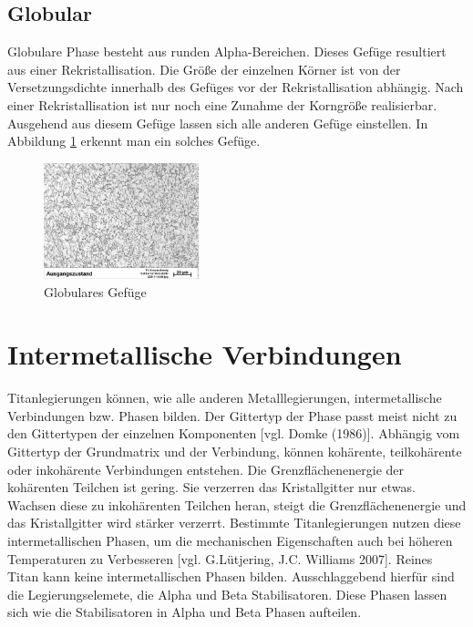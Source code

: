 \documentclass[a4paper, 11pt]{tubsreprt}
\begin{document}
\subsection{Globular}
Globulare Phase besteht aus runden Alpha-Bereichen. Dieses Gefüge resultiert aus einer Rekristallisation. Die Größe der einzelnen Körner ist von der Versetzungsdichte innerhalb des Gefüges vor der Rekristallisation abhängig. Nach einer Rekristallisation ist nur noch eine Zunahme der Korngröße realisierbar. Ausgehend aus diesem Gefüge lassen sich alle anderen Gefüge einstellen. In Abbildung \ref{globular} erkennt man ein solches Gefüge. 
\begin{figure} %
\centering
\includegraphics[width=0.4\textwidth]{Bilder/Ausgangsgefuege.jpg}
\caption{Globulares Gefüge}
\label{globular}
\end{figure}

\section{Intermetallische Verbindungen}
Titanlegierungen können, wie alle anderen Metalllegierungen, intermetallische Verbindungen bzw. Phasen bilden. Der Gittertyp der Phase passt meist nicht zu den Gittertypen der einzelnen Komponenten [vgl. Domke (1986)]. Abhängig vom Gittertyp der Grundmatrix und der Verbindung,  können kohärente, teilkohärente oder inkohärente Verbindungen entstehen. Die Grenzflächenenergie der kohärenten Teilchen ist gering. Sie verzerren das Kristallgitter nur etwas. Wachsen diese zu inkohärenten Teilchen heran, steigt die Grenzflächenenergie und das Kristallgitter wird stärker verzerrt.
Bestimmte Titanlegierungen nutzen diese intermetallischen Phasen, um die mechanischen Eigenschaften auch bei höheren Temperaturen zu Verbesseren [vgl. G.Lütjering, J.C. Williams 2007].   
Reines Titan kann keine intermetallischen Phasen bilden. Ausschlaggebend hierfür sind die Legierungselemete, die Alpha und Beta Stabilisatoren.  Diese Phasen lassen sich wie die Stabilisatoren  in Alpha und Beta Phasen aufteilen.  
\end{document}
